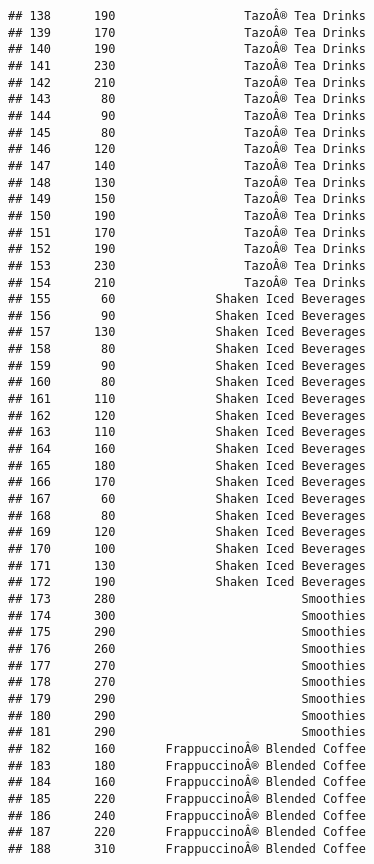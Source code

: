 \documentclass[
]{article}
\begin{document}
\begin{verbatim}
## 138      190                  TazoÂ® Tea Drinks
## 139      170                  TazoÂ® Tea Drinks
## 140      190                  TazoÂ® Tea Drinks
## 141      230                  TazoÂ® Tea Drinks
## 142      210                  TazoÂ® Tea Drinks
## 143       80                  TazoÂ® Tea Drinks
## 144       90                  TazoÂ® Tea Drinks
## 145       80                  TazoÂ® Tea Drinks
## 146      120                  TazoÂ® Tea Drinks
## 147      140                  TazoÂ® Tea Drinks
## 148      130                  TazoÂ® Tea Drinks
## 149      150                  TazoÂ® Tea Drinks
## 150      190                  TazoÂ® Tea Drinks
## 151      170                  TazoÂ® Tea Drinks
## 152      190                  TazoÂ® Tea Drinks
## 153      230                  TazoÂ® Tea Drinks
## 154      210                  TazoÂ® Tea Drinks
## 155       60              Shaken Iced Beverages
## 156       90              Shaken Iced Beverages
## 157      130              Shaken Iced Beverages
## 158       80              Shaken Iced Beverages
## 159       90              Shaken Iced Beverages
## 160       80              Shaken Iced Beverages
## 161      110              Shaken Iced Beverages
## 162      120              Shaken Iced Beverages
## 163      110              Shaken Iced Beverages
## 164      160              Shaken Iced Beverages
## 165      180              Shaken Iced Beverages
## 166      170              Shaken Iced Beverages
## 167       60              Shaken Iced Beverages
## 168       80              Shaken Iced Beverages
## 169      120              Shaken Iced Beverages
## 170      100              Shaken Iced Beverages
## 171      130              Shaken Iced Beverages
## 172      190              Shaken Iced Beverages
## 173      280                          Smoothies
## 174      300                          Smoothies
## 175      290                          Smoothies
## 176      260                          Smoothies
## 177      270                          Smoothies
## 178      270                          Smoothies
## 179      290                          Smoothies
## 180      290                          Smoothies
## 181      290                          Smoothies
## 182      160       FrappuccinoÂ® Blended Coffee
## 183      180       FrappuccinoÂ® Blended Coffee
## 184      160       FrappuccinoÂ® Blended Coffee
## 185      220       FrappuccinoÂ® Blended Coffee
## 186      240       FrappuccinoÂ® Blended Coffee
## 187      220       FrappuccinoÂ® Blended Coffee
## 188      310       FrappuccinoÂ® Blended Coffee

\end{verbatim}
\end{document}
